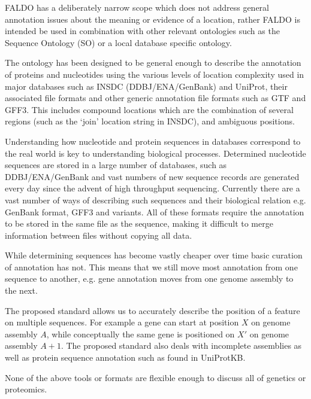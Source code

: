 FALDO has a deliberately narrow scope which does not address general annotation
issues about the meaning or evidence of a location, rather FALDO is intended be
used in combination with other relevant ontologies such as the Sequence Ontology
(SO) \cite{SequenceOntology2005} or a local database specific ontology.

The ontology has been designed to be general enough to describe the annotation
of proteins and nucleotides using the various levels of location complexity used
in major databases such as INSDC (DDBJ/ENA/GenBank) and UniProt, their
associated file formats and other generic annotation file formats such as GTF
and GFF3. This includes compound locations which are the combination of
several regions (such as the `join' location string in INSDC), and ambiguous
positions.

Understanding how nucleotide and protein sequences in databases correspond to the real world is key to understanding biological processes.
Determined nucleotide sequences are stored in a large number of databases,
such as DDBJ/ENA/GenBank and vast numbers of new sequence records are generated every day since the advent of high throughput sequencing.
Currently there are a vast number of ways of describing such sequences and their biological relation e.g. GenBank format, GFF3 and variants.
All of these formats require the annotation to be stored in the same file as the sequence,
making it difficult to merge information between files without copying all data.

While determining sequences has become vastly cheaper over time basic curation of annotation has not.
This means that we still move most annotation from one sequence to another,
e.g. gene annotation moves from one genome assembly to the next.

The proposed standard allows us to accurately describe the position of a feature on multiple sequences.
For example a gene can start at position $X$ on genome assembly $A$,
while conceptually the same gene is positioned on $X'$ on genome assembly $A+1$.
The proposed standard also deals with incomplete assemblies as well as protein sequence annotation such as found in UniProtKB.

None of the above tools or formats are flexible enough to discuss all of genetics or proteomics. 


